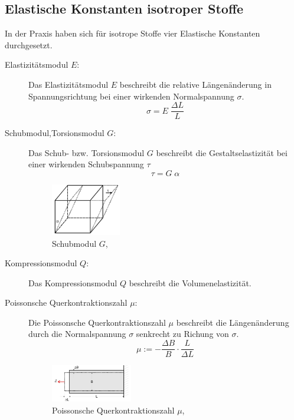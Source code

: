 \subsection{Elastische Konstanten isotroper Stoffe}
In der Praxis haben sich für isotrope Stoffe vier Elastische Konstanten durchgesetzt.\\
\begin{description}
\item[Elastizitätsmodul $E$:]
    Das Elastizitätsmodul $E$ beschreibt die relative Längenänderung in Spannungsrichtung
    bei einer wirkenden Normalspannung $\sigma$.
    \begin{equation}
        \sigma = E \; \frac{\Delta L}{L}
        \label{eqn:def_elastizitätsmodul}
    \end{equation}

\item[Schubmodul,Torsionsmodul $G$:]
    Das Schub- bzw. Torsionsmodul $G$ beschreibt die Gestaltselastizität bei einer
    wirkenden Schubspannung $\tau$
    \begin{equation}
        \tau = G \; \alpha
        \label{eqn:def_schubmodul}
    \end{equation}
    
    \begin{figure}[h]
        \centering
        \includegraphics[width=0.3\textwidth, height=0.2\textwidth]{bilder/Schubmodul.jpg}
        \caption{Schubmodul $G$,\cite[4]{Anleitung}}        
        \label{fig:schubmodul}
    \end{figure}

\item[Kompressionsmodul $Q$:]
    Das Kompressionsmodul $Q$ beschreibt die Volumenelastizität.

\newpage
\item[Poissonsche Querkontraktionszahl $\mu$:]
    Die Poissonsche Querkontraktionszahl $\mu$ beschreibt die Längenänderung durch die Normalspannung $\sigma$
    senkrecht zu Richung von $\sigma$.
    \begin{equation}
        \mu := -\frac{\Delta B}{B} \cdot \frac{L}{\Delta L}
        \label{eqn:def_poissonsche}
    \end{equation}
    
    \begin{figure}[h]
        \centering
        \includegraphics[width=0.35\textwidth, height=0.15\textwidth]{bilder/Poissonsche_Quer.jpg}
        \caption{Poissonsche Querkontraktionszahl $\mu$,\cite[3]{Anleitung}}        
        \label{fig:poissonsche_Quer}
    \end{figure}
\end{description}


